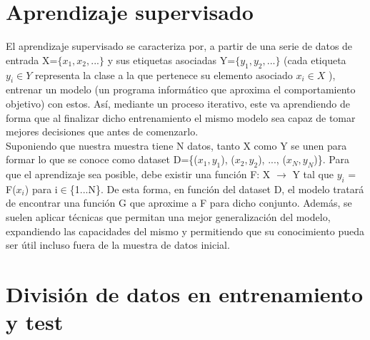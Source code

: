 \section{Aprendizaje supervisado}

El aprendizaje supervisado \cite{aprendizaje_supervisado} se caracteriza por, a partir de una serie de datos de entrada X=$\{x_1, x_2, ...\}$ y sus etiquetas asociadas Y=$\{y_1, y_2, ...\}$ (cada etiqueta $y_i \in Y$ representa la clase a la que pertenece su elemento asociado $x_i \in X$ \cite{etiquetas}), entrenar un modelo (un programa informático que aproxima el comportamiento objetivo) con estos. Así, mediante un proceso iterativo, este va aprendiendo de forma que al finalizar dicho entrenamiento el mismo modelo sea capaz de tomar mejores decisiones que antes de comenzarlo. \\
Suponiendo que nuestra muestra tiene N datos, tanto X como Y se unen para formar lo que se conoce como dataset D=\{($x_1, y_1$), ($x_2, y_2$), ..., ($x_N, y_N$)\}. Para que el aprendizaje sea posible, debe existir una función F: X $\rightarrow$ Y tal que $y_i$ = F($x_i$) para i$\in$\{1...N\}. De esta forma, en función del dataset D, el modelo tratará de encontrar una función G que aproxime a F para dicho conjunto. Además, se suelen aplicar técnicas que permitan una mejor generalización del modelo, expandiendo las capacidades del mismo y permitiendo que su conocimiento pueda ser útil incluso fuera de la muestra de datos inicial. \cite{Learning_From_Data}

\section{División de datos en entrenamiento y test}

